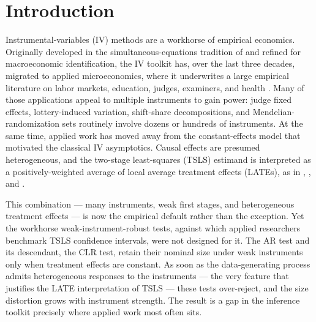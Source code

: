 \section{Introduction}
\label{sec:introduction}

Instrumental-variables (IV) methods are a workhorse of empirical economics. Originally developed in the simultaneous-equations tradition of \cite{andersonEstimationParametersSingle1949} and refined for macroeconomic identification, the IV toolkit has, over the last three decades, migrated to applied microeconomics, where it underwrites a large empirical literature on labor markets, education, judges, examiners, and health \citep{angristTwoStageLeastSquares1995, angristInterpretationInstrumentalVariables2000, baiocchiTutorialBiostatisticsInstrumental2014}. Many of those applications appeal to multiple instruments to gain power: judge fixed effects, lottery-induced variation, shift-share decompositions, and Mendelian-randomization sets routinely involve dozens or hundreds of instruments. At the same time, applied work has moved away from the constant-effects model that motivated the classical IV asymptotics. Causal effects are presumed heterogeneous, and the two-stage least-squares (TSLS) estimand is interpreted as a positively-weighted average of local average treatment effects (LATEs), as in \cite{angristTwoStageLeastSquares1995}, \cite{kolesarEstimationInstrumentalVariables2013}, and \cite{mogstadCausalInterpretationTwoStage2021}.

This combination — many instruments, weak first stages, and heterogeneous treatment effects — is now the empirical default rather than the exception. Yet the workhorse weak-instrument-robust tests, against which applied researchers benchmark TSLS confidence intervals, were not designed for it. The \cite{andersonEstimationParametersSingle1949} AR test and its descendant, the \cite{moreiraConditionalLikelihoodRatio2003} CLR test, retain their nominal size under weak instruments only when treatment effects are constant. As soon as the data-generating process admits heterogeneous responses to the instruments — the very feature that justifies the LATE interpretation of TSLS — these tests over-reject, and the size distortion grows with instrument strength. The result is a gap in the inference toolkit precisely where applied work most often sits.

